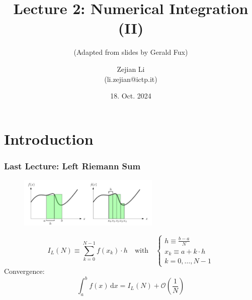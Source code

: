 \documentclass[11pt,aspectratio=169]{beamer}
\begin{document}
\author{Zejian Li \\(li.zejian@ictp.it)}
\title{Lecture 2: Numerical Integration (II)}
\subtitle{(Adapted from slides by Gerald Fux)}
\date{18. Oct. 2024}


\begin{frame}[plain]
	\maketitle
\end{frame}


\section{Introduction}

\begin{frame}
\frametitle{Last Lecture: Left Riemann Sum}
\begin{figure}
	\centering
	\includegraphics[width=0.6\textwidth]{fig/integration-definition}
\end{figure}
\pause
\begin{equation*}
	I_L(N) \equiv  \sum_{k=0}^{N-1} f(x_k) \cdot h  \quad \text{with} \quad
	\begin{cases}
		h \equiv \frac{b-a}{N} \\
		x_k \equiv a + k \cdot h \\
		k = 0, \ldots, N-1
	\end{cases}
\end{equation*}
\pause
Convergence:
\begin{equation*}
	\int_a^b f(x) \, \mathrm{d}x = I_L(N) + \mathcal{O}\left(\frac{1}{N}\right)
\end{equation*}
\end{frame}
\end{document}
